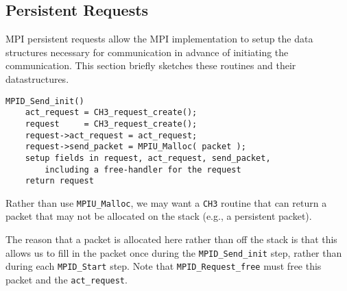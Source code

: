 \documentclass{article}
\def\code{\begingroup\makeustext\eatcode}
\def\eatcode#1{\texttt{#1}\endgroup}
\begin{document}


\subsection{Persistent Requests}
MPI persistent requests allow the MPI implementation to setup the data
structures necessary for communication in advance of initiating the
communication.  This section briefly sketches these routines and their
datastructures. 

\begin{verbatim}
MPID_Send_init()
    act_request = CH3_request_create();
    request     = CH3_request_create();
    request->act_request = act_request;
    request->send_packet = MPIU_Malloc( packet );
    setup fields in request, act_request, send_packet, 
        including a free-handler for the request
    return request   
\end{verbatim}
Rather than use \code{MPIU_Malloc}, we may want a \code{CH3} routine that can
return a packet that may not be allocated on the stack (e.g., a persistent
packet).  

The reason that a packet is allocated here rather than off the stack
is that this allows us to fill in the packet once during the
\code{MPID\_Send\_init} step, rather than during each
\code{MPID\_Start} step.  Note that \code{MPID\_Request\_free} must
free this packet and the \code{act\_request}.

\end{document}

